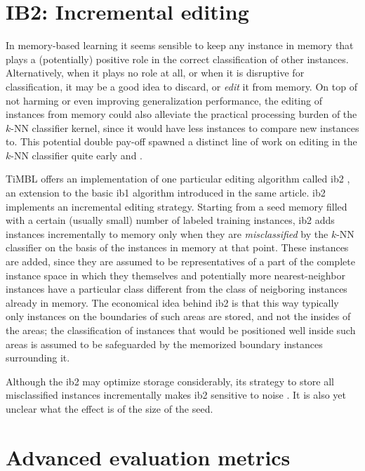 \documentclass{report}
\begin{document}
\section{IB2: Incremental editing}
\label{ib2}

In memory-based learning it seems sensible to keep any instance in
memory that plays a (potentially) positive role in the correct
classification of other instances. Alternatively, when it plays no
role at all, or when it is disruptive for classification, it may be a
good idea to discard, or {\em edit} it from memory. On top of not
harming or even improving generalization performance, the editing of
instances from memory could also alleviate the practical processing
burden of the $k$-NN classifier kernel, since it would have less
instances to compare new instances to. This potential double pay-off
spawned a distinct line of work on editing in the $k$-NN classifier
quite early  and .

TiMBL offers an implementation of one particular editing algorithm
called {\sc ib2} \cite{Aha+91}, an extension to the basic {\sc ib1}
algorithm introduced in the same article. {\sc ib2} implements an
incremental editing strategy. Starting from a seed memory filled with
a certain (usually small) number of labeled training instances, {\sc
ib2} adds instances incrementally to memory only when they are {\em
misclassified}\/ by the $k$-NN classifier on the basis of the
instances in memory at that point. These instances are added, since
they are assumed to be representatives of a part of the complete
instance space in which they themselves and potentially more
nearest-neighbor instances have a particular class different from the
class of neigboring instances already in memory. The economical idea
behind {\sc ib2} is that this way typically only instances on the
boundaries of such areas are stored, and not the insides of the areas;
the classification of instances that would be positioned well inside
such areas is assumed to be safeguarded by the memorized boundary
instances surrounding it.

Although the {\sc ib2} may optimize storage
considerably, its strategy to store all misclassified instances
incrementally makes {\sc ib2} sensitive to noise \cite{Aha+91}. It is
also yet unclear what the effect is of the size of the seed.

\section{Advanced evaluation metrics}
\label{advancedstats}
\end{document}
